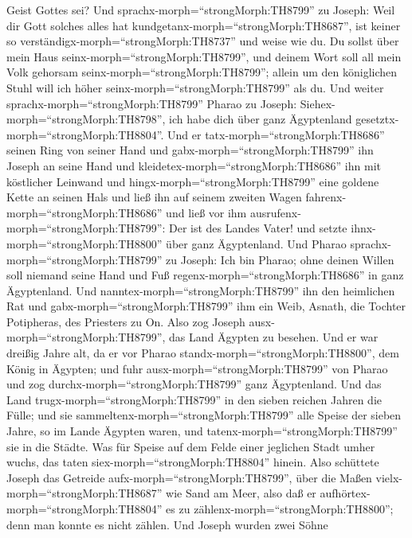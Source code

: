 Geist Gottes sei?  Und sprachx-morph=``strongMorph:TH8799''
zu Joseph: Weil dir Gott solches alles hat
kundgetanx-morph=``strongMorph:TH8687'', ist keiner so
verständigx-morph=``strongMorph:TH8737'' und weise wie du. 
Du sollst über mein Haus seinx-morph=``strongMorph:TH8799'', und deinem
Wort soll all mein Volk gehorsam seinx-morph=``strongMorph:TH8799'';
allein um den königlichen Stuhl will ich höher
seinx-morph=``strongMorph:TH8799'' als du.  Und weiter
sprachx-morph=``strongMorph:TH8799'' Pharao zu Joseph:
Siehex-morph=``strongMorph:TH8798'', ich habe dich über ganz Ägyptenland
gesetztx-morph=``strongMorph:TH8804''.  Und er
tatx-morph=``strongMorph:TH8686'' seinen Ring von seiner Hand und
gabx-morph=``strongMorph:TH8799'' ihn Joseph an seine Hand und
kleidetex-morph=``strongMorph:TH8686'' ihn mit köstlicher Leinwand und
hingx-morph=``strongMorph:TH8799'' eine goldene Kette an seinen Hals
 und ließ ihn auf seinem zweiten Wagen
fahrenx-morph=``strongMorph:TH8686'' und ließ vor ihm
ausrufenx-morph=``strongMorph:TH8799'': Der ist des Landes Vater! und
setzte ihnx-morph=``strongMorph:TH8800'' über ganz Ägyptenland.
 Und Pharao sprachx-morph=``strongMorph:TH8799'' zu Joseph:
Ich bin Pharao; ohne deinen Willen soll niemand seine Hand und Fuß
regenx-morph=``strongMorph:TH8686'' in ganz Ägyptenland. 
Und nanntex-morph=``strongMorph:TH8799'' ihn den heimlichen Rat und
gabx-morph=``strongMorph:TH8799'' ihm ein Weib, Asnath, die Tochter
Potipheras, des Priesters zu On. Also zog Joseph
ausx-morph=``strongMorph:TH8799'', das Land Ägypten zu besehen.
 Und er war dreißig Jahre alt, da er vor Pharao
standx-morph=``strongMorph:TH8800'', dem König in Ägypten; und fuhr
ausx-morph=``strongMorph:TH8799'' von Pharao und zog
durchx-morph=``strongMorph:TH8799'' ganz Ägyptenland.  Und
das Land trugx-morph=``strongMorph:TH8799'' in den sieben reichen Jahren
die Fülle;  und sie sammeltenx-morph=``strongMorph:TH8799''
alle Speise der sieben Jahre, so im Lande Ägypten waren, und
tatenx-morph=``strongMorph:TH8799'' sie in die Städte. Was für Speise
auf dem Felde einer jeglichen Stadt umher wuchs, das taten
siex-morph=``strongMorph:TH8804'' hinein.  Also schüttete
Joseph das Getreide aufx-morph=``strongMorph:TH8799'', über die Maßen
vielx-morph=``strongMorph:TH8687'' wie Sand am Meer, also daß er
aufhörtex-morph=``strongMorph:TH8804'' es zu
zählenx-morph=``strongMorph:TH8800''; denn man konnte es nicht zählen.
 Und Joseph wurden zwei Söhne
